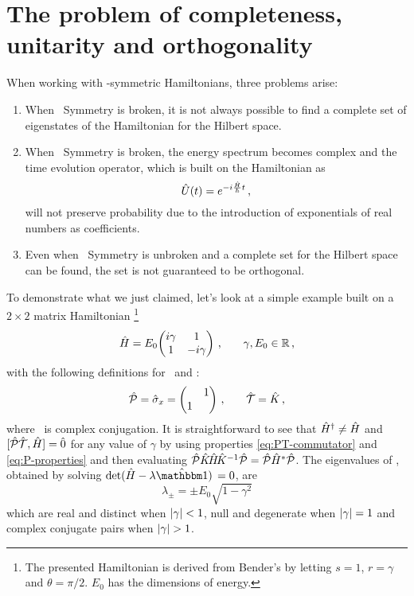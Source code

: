     \section{The problem of completeness, unitarity and orthogonality}\label{s:problem}
        When working with \PT-symmetric Hamiltonians, three problems arise:
        \begin{enumerate}[label = \mybullet]
            \item When \PT\ Symmetry is broken, it is not always possible to find a complete set of eigenstates of the Hamiltonian for the Hilbert space.
            \item When \PT\ Symmetry is broken, the energy spectrum becomes complex and the time evolution operator, which is built on the Hamiltonian as 
            \begin{equation}
                \label{eq:time-evolution}
                \hU\pqty{t} = \myexp{-i\frac{\hH}{\hbar}t}
                \mycomma
            \end{equation}
            will not preserve probability due to the introduction of exponentials of real numbers as coefficients.
            \item Even when \PT\ Symmetry is unbroken and a complete set for the Hilbert space can be found, the set is not guaranteed to be orthogonal.
        \end{enumerate}
        To demonstrate what we just claimed, let's look at a simple example built on a $2\times2$ matrix Hamiltonian \cite{Bender2005,Bender2007}\footnote{The presented Hamiltonian is derived from Bender's by letting $s = 1$, $r = \gamma$ and $\theta = \pi/2$. $E_0$ has the dimensions of energy.}
        \begin{equation}
            \label{eq:ex:reduced-2x2-hamiltonian}
            \hH = E_0\! \pmqty{\dmat[1]{i\gamma, -i\gamma}}
            \mycomma\qquad
            \gamma,E_0\in\bbR
            \mycomma
        \end{equation}
        with the following definitions for \hP\ and \hT :
        \begin{equation}
            \label{eq:ex:reduced-2x2-P-T}
            \hP = \hat{\sigma}_x = \pmqty{\admat{1,1}}
            \mycomma\qquad
            \hT = \hK
            \mycomma
        \end{equation}
        where \hK\ is complex conjugation. It is straightforward to see that $\hat{H}^\dag \neq \hat{H}$ and $\comm*{\hPT}{\hH}\! = \hzero$ for any value of $\gamma$ by using properties \eqref{eq:PT-commutator} and \eqref{eq:P-properties} and then evaluating $\mathcal{\hat{P}}\hat{K}\!\hat{H}\!\hat{K}^{-1}\mathcal{\hat{P}} = \mathcal{\hat{P}}\hat{H}^*\mathcal{\hat{P}}$. The eigenvalues of \hH, obtained by solving $\det\!\pqty*{\hH - \lambda\hidM} = 0$, are
        \begin{equation*}
            \lambda_\pm = \pm E_0 \sqrt{1-\gamma^2}
        \end{equation*}
        which are real and distinct when $\abs{\gamma} < 1$, null and degenerate when $\abs{\gamma} = 1$ and complex conjugate pairs when $\abs{\gamma} > 1$.
        

